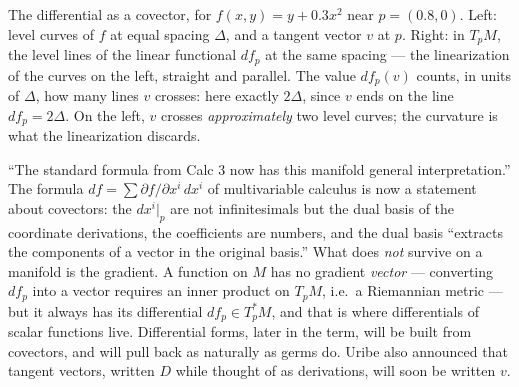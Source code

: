 \documentclass[11pt]{report}
\begin{document}
\begin{center}
\end{center}

The differential as a covector, for $f(x,y) = y + 0.3x^2$ near $p = (0.8, 0)$. Left: level curves of $f$ at equal spacing $\Delta$, and a tangent vector $v$ at $p$. Right: in $T_pM$, the level lines of the linear functional $df_p$ at the same spacing --- the linearization of the curves on the left, straight and parallel. The value $df_p(v)$ counts, in units of $\Delta$, how many lines $v$ crosses: here exactly $2\Delta$, since $v$ ends on the line $df_p = 2\Delta$. On the left, $v$ crosses \emph{approximately} two level curves; the curvature is what the linearization discards.

\begin{rembox}\label{rem:differential-not-gradient}
``The standard formula from Calc 3 now has this manifold general interpretation.'' The formula $df = \sum \partial f/\partial x^i\,dx^i$ of multivariable calculus is now a statement about covectors: the $dx^i|_p$ are not infinitesimals but the dual basis of the coordinate derivations, the coefficients are numbers, and the dual basis ``extracts the components of a vector in the original basis.'' What does \emph{not} survive on a manifold is the gradient. A function on $M$ has no gradient \emph{vector} --- converting $df_p$ into a vector requires an inner product on $T_pM$, i.e.\ a Riemannian metric --- but it always has its differential $df_p \in T_p^*M$, and that is where differentials of scalar functions live. Differential forms, later in the term, will be built from covectors, and will pull back as naturally as germs do. Uribe also announced that tangent vectors, written $D$ while thought of as derivations, will soon be written $v$.
\end{rembox}
\end{document}
